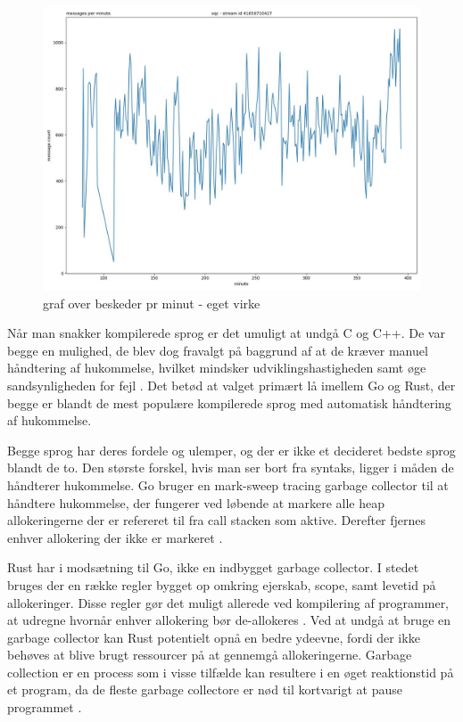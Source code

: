 \documentclass{article}
\begin{document}
\begin{figure}[hp]
\centering
\includegraphics[width=\textwidth]{messages-per-minute-xqc-41658710427.jpg}
\caption{graf over beskeder pr minut - eget virke}
\end{figure}


Når man snakker kompilerede sprog er det umuligt at undgå C og C++. De var begge en mulighed, de blev dog fravalgt på baggrund af at de kræver manuel håndtering af hukommelse, hvilket mindsker udviklingshastigheden samt øge sandsynligheden for fejl \cite{thomas_proactive_2019}. Det betød at valget primært lå imellem Go og Rust, der begge er blandt de mest populære kompilerede sprog med automatisk håndtering af hukommelse.

Begge sprog har deres fordele og ulemper, og der er ikke et decideret bedste sprog blandt de to. Den største forskel, hvis man ser bort fra syntaks, ligger i måden de håndterer hukommelse. Go bruger en mark-sweep tracing garbage collector til at håndtere hukommelse, der fungerer ved løbende at markere alle heap allokeringerne der er refereret til fra call stacken som aktive. Derefter fjernes enhver allokering der ikke er markeret \cite{go_guide_nodate}.

Rust har i modsætning til Go, ikke en indbygget garbage collector. I stedet bruges der en række regler bygget op omkring ejerskab, scope, samt levetid på allokeringer. Disse regler gør det muligt allerede ved kompilering af programmer, at udregne hvornår enhver allokering bør de-allokeres \cite{rust_what_nodate}. Ved at undgå at bruge en garbage collector kan Rust potentielt opnå en bedre ydeevne, fordi der ikke behøves at blive brugt ressourcer på at gennemgå allokeringerne. Garbage collection er en process som i visse tilfælde kan resultere i en øget reaktionstid på et program, da de fleste garbage collectore er nød til kortvarigt at pause programmet \cite{howarth_why_2020}.
\end{document}
